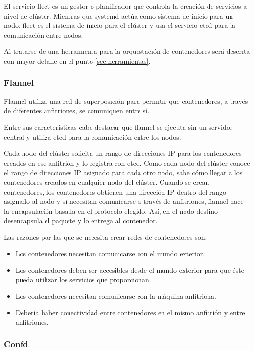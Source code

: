 El servicio fleet es un gestor o planificador que controla la creación de servicios a nivel de clúster. Mientras que systemd actúa como sistema de inicio para un nodo, fleet es el sistema de inicio para el clúster y usa el servicio etcd para la comunicación entre nodos.

Al tratarse de una herramienta para la orquestación de contenedores será descrita con mayor detalle en el punto \hyperref[sec:herramientas]{\ref{sec:herramientas}}.

\subsubsection{Flannel}

Flannel utiliza una red de superposición para permitir que contenedores, a través de diferentes anfitriones, se comuniquen entre sí.

Entre sus características cabe destacar que flannel se ejecuta sin un servidor central y utiliza etcd para la comunicación entre los nodos.

Cada nodo del clúster solicita un rango de direcciones IP para los contenedores creados en ese anfitrión y lo registra con etcd. Como cada nodo del clúster conoce el rango de direcciones IP asignado para cada otro nodo, sabe cómo llegar a los contenedores creados en cualquier nodo del clúster. Cuando se crean contenedores, los contenedores obtienen una dirección IP dentro del rango asignado al nodo y si necesitan comunicarse a través de anfitriones, flannel hace la encapsulación basada en el protocolo elegido. Así, en el nodo destino desencapsula el paquete y lo entrega al contenedor.

Las razones por las que se necesita crear redes de contenedores son:
\begin{itemize}
\item Los contenedores necesitan comunicarse con el mundo exterior.
\item Los contenedores deben ser accesibles desde el mundo exterior para que éste pueda utilizar los servicios que proporcionan.
\item Los contenedores necesitan comunicarse con la máquina anfitriona.
\item Debería haber conectividad entre contenedores en el mismo anfitrión y entre anfitriones.
\end{itemize}

\subsubsection{Confd}

